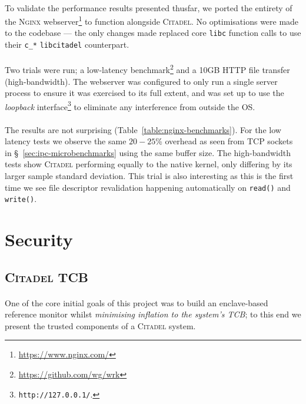 \paragraph{} To validate the performance results presented thusfar, we ported the entirety of the \textsc{Nginx} webserver\footnote{\url{https://www.nginx.com/}} to function alongside \textsc{Citadel}. No optimisations were made to the codebase --- the only changes made replaced core \texttt{libc} function calls to use their \texttt{c\_*} \texttt{libcitadel} counterpart.

\paragraph{} Two trials were run; a low-latency benchmark\footnote{\url{https://github.com/wg/wrk}} and a 10GB HTTP file transfer (high-bandwidth). The webserver was configured to only run a single server process to ensure it was exercised to its full extent, and was set up to use the \textit{loopback} interface\footnote{\texttt{http://127.0.0.1/}.} to eliminate any interference from outside the OS. 

\paragraph{} The results are not surprising (Table~\ref{table:nginx-benchmarks}). For the low latency tests we observe the same $20-25$\% overhead as seen from TCP sockets in §~\ref{sec:ipc-microbenchmarks} using the same buffer size. The high-bandwidth tests show \textsc{Citadel} performing equally to the native kernel, only differing by its larger sample standard deviation. This trial is also interesting as this is the first time we see file descriptor revalidation happening automatically on \texttt{read()} and \texttt{write()}. 





\section{Security}

\subsection{\textsc{Citadel} TCB}
\label{sec:citadel-tcb}

\paragraph{} One of the core initial goals of this project was to build an enclave-based reference monitor whilst \textit{minimising inflation to the system's TCB}; to this end we present the trusted components of a \textsc{Citadel} system.

